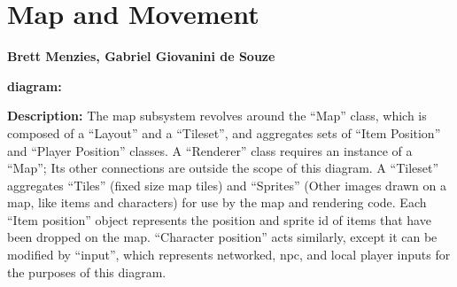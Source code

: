 \documentclass{report}
\begin{document}
\chapter{Map and Movement}
\textbf{Brett Menzies, Gabriel Giovanini de Souze}

\textbf{diagram:}

\textbf{Description:}
The map subsystem revolves around the ``Map'' class,
 which is composed of a ``Layout'' and a ``Tileset'',
 and aggregates sets of ``Item Position'' and ``Player Position'' classes.
 A ``Renderer'' class requires an instance of a ``Map'';
 Its other connections are outside the scope of this diagram.
 A ``Tileset'' aggregates ``Tiles'' (fixed size map tiles) and 
 ``Sprites'' (Other images drawn on a map, like items and characters) for use by the map and rendering code.
 Each ``Item position'' object represents the position and sprite id of items that have been dropped on the map.
 ``Character position'' acts similarly, except it can be modified by ``input'', which represents 
 networked, npc, and local player inputs for the purposes of this diagram.
\end{document}
